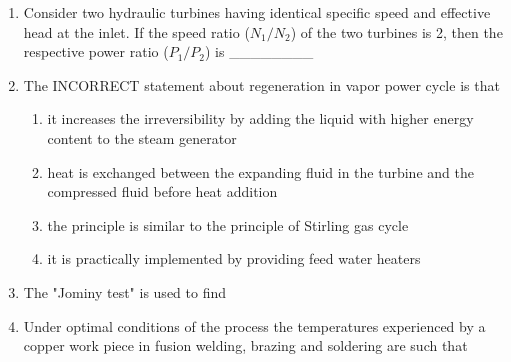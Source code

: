 \documentclass[journal,11pt,onecolumn]{IEEEtran}
\begin{document}
\begin{enumerate}
    \item Consider two hydraulic turbines having identical specific speed and effective head at the inlet. If the speed ratio ($N_1/N_2$) of the two turbines is 2, then the respective power ratio ($P_1/P_2$) is \_\_\_\_\_\_\_\_

    \item The INCORRECT statement about regeneration in vapor power cycle is that

          \begin{enumerate}

              \item it increases the irreversibility by adding the liquid with higher energy content to the steam generator

              \item heat is exchanged between the expanding fluid in the turbine and the compressed fluid before heat addition

              \item the principle is similar to the principle of Stirling gas cycle

              \item it is practically implemented by providing feed water heaters

          \end{enumerate}

    \item The "Jominy test" is used to find

          \begin{enumerate}


          \end{enumerate}

    \item Under optimal conditions of the process the temperatures experienced by a copper work piece in fusion welding, brazing and soldering are such that


\end{enumerate}
\end{document}
